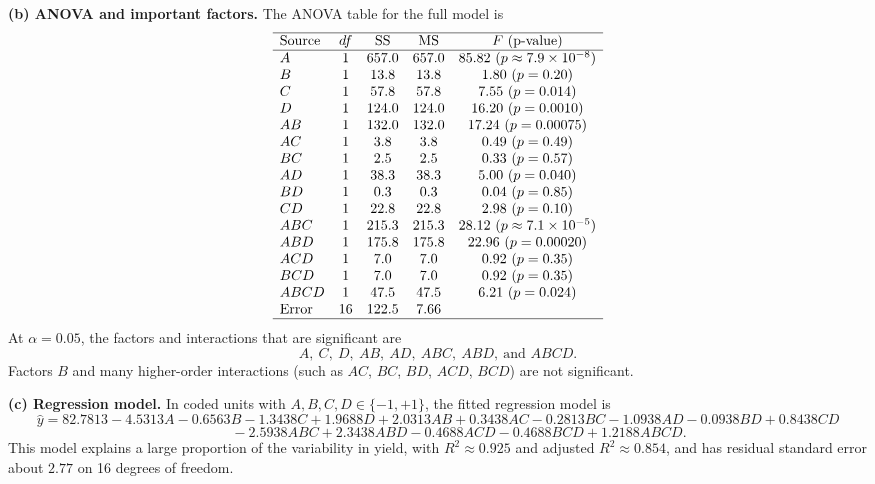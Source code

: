 \documentclass[answers,12pt,addpoints]{exam}
\begin{document}
\begin{solution}
\medskip
\textbf{(b) ANOVA and important factors.}
The ANOVA table for the full model is
\[
\begin{array}{lcccc}
\hline
\text{Source} & df & \text{SS} & \text{MS} & F \ (\text{p-value}) \\
\hline
A       & 1 & 657.0 & 657.0 & 85.82\ (p \approx 7.9\times 10^{-8}) \\
B       & 1 &  13.8 &  13.8 &  1.80\ (p = 0.20) \\
C       & 1 &  57.8 &  57.8 &  7.55\ (p = 0.014) \\
D       & 1 & 124.0 & 124.0 & 16.20\ (p = 0.0010) \\
AB      & 1 & 132.0 & 132.0 & 17.24\ (p = 0.00075) \\
AC      & 1 &   3.8 &   3.8 &  0.49\ (p = 0.49) \\
BC      & 1 &   2.5 &   2.5 &  0.33\ (p = 0.57) \\
AD      & 1 &  38.3 &  38.3 &  5.00\ (p = 0.040) \\
BD      & 1 &   0.3 &   0.3 &  0.04\ (p = 0.85) \\
CD      & 1 &  22.8 &  22.8 &  2.98\ (p = 0.10) \\
ABC     & 1 & 215.3 & 215.3 & 28.12\ (p \approx 7.1\times 10^{-5}) \\
ABD     & 1 & 175.8 & 175.8 & 22.96\ (p = 0.00020) \\
ACD     & 1 &   7.0 &   7.0 &  0.92\ (p = 0.35) \\
BCD     & 1 &   7.0 &   7.0 &  0.92\ (p = 0.35) \\
ABCD    & 1 &  47.5 &  47.5 &  6.21\ (p = 0.024) \\
\text{Error} & 16 & 122.5 &  7.66 & \\
\hline
\end{array}
\]
At $\alpha = 0.05$, the factors and interactions that are significant are
\[
A,\ C,\ D,\ AB,\ AD,\ ABC,\ ABD,\ \text{and }ABCD.
\]
Factors $B$ and many higher-order interactions (such as $AC$, $BC$, $BD$, $ACD$, $BCD$) are not significant.

\medskip
\textbf{(c) Regression model.}
In coded units with $A,B,C,D \in \{-1,+1\}$, the fitted regression model is
\[
\hat{y} = 82.7813 - 4.5313A - 0.6563B - 1.3438C + 1.9688D
          + 2.0313AB + 0.3438AC - 0.2813BC - 1.0938AD - 0.0938BD + 0.8438CD
\]
\[
\qquad\quad - 2.5938ABC + 2.3438ABD - 0.4688ACD - 0.4688BCD + 1.2188ABCD.
\]
This model explains a large proportion of the variability in yield, with $R^2 \approx 0.925$ and adjusted $R^2 \approx 0.854$, and has residual standard error about $2.77$ on 16 degrees of freedom.


\end{solution}
\end{document}
